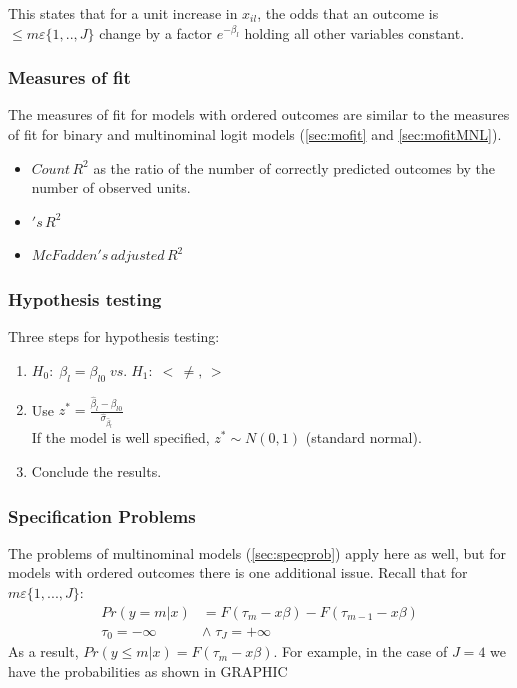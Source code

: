 				This states that for a unit increase in $x_{il}$, the odds that an outcome is $\leq m \varepsilon\{1,..,J\}$ change by a factor $e^{-\beta_l}$ holding all other variables constant.
		\subsubsection{Measures of fit}\label{sec:mofitOrd}
			The measures of fit for models with ordered outcomes are similar to the measures of fit for binary and multinominal logit models (\ref{sec:mofit} and \ref{sec:mofitMNL}).
			\begin{itemize}
				\item $Count\,R^2$ as the ratio of the number of correctly predicted outcomes by the number of observed units.
				\item $'s\,R^2$
				\item $McFadden's\,adjusted\,R^2$
			\end{itemize}			
		\subsubsection{Hypothesis testing}
				Three steps for hypothesis testing:%
				\begin{enumerate}
					\item 	$H_0:\;\beta_l=\beta_{l0}\; vs. \;H_1:\;<\,\neq,\,>$
					\item	Use $z^*=\frac{\hat{\beta}_l-\beta_{l0}}{\hat{\sigma}_{\hat{\beta}_l}}$\\%
							If the model is well specified, $z^*\sim N(0,1)$ (standard normal).
					\item	Conclude the results.
				\end{enumerate}
		\subsubsection{Specification Problems}
			The problems of multinominal models (\ref{sec:specprob}) apply here as well, but for models with ordered outcomes there is one additional issue.
				Recall that for $m\varepsilon\{1,...,J\}$:
				\begin{align*}
					Pr(y=m|x)&=F(\tau_m-x\beta)-F(\tau_{m-1}-x\beta)\\
					\tau_{0}=-\infty\;&\wedge\;\tau_{J}=+\infty
				\end{align*}
				As a result, $Pr(y\leq m|x)=F(\tau_m-x\beta)$. For example, in the case of $J=4$ we have the probabilities as shown in GRAPHIC %
				
